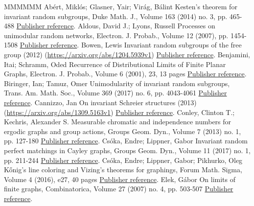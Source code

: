 \begin{thebibliography}{MMMMMM}
 Abért, Miklós; Glasner, Yair; Virág, Bálint Kesten’s theorem for invariant random subgroups, Duke Math. J., Volume 163 (2014) no. 3, pp. 465-488 \href{https://ahl.centre-mersenne.org/item/AHL_2021__4__1705_0/#abert2014kesten}{Publisher reference}.
 Aldous, David J.; Lyons, Russell Processes on unimodular random networks, Electron. J. Probab., Volume 12 (2007), pp. 1454-1508 \href{https://ahl.centre-mersenne.org/item/AHL_2021__4__1705_0/#aldous2007processes}{Publisher reference}.
 Bowen, Lewis Invariant random subgroups of the free group (2012) (\url{https://arxiv.org/abs/1204.5939v1}) \href{https://ahl.centre-mersenne.org/item/AHL_2021__4__1705_0/#bowen2012invariant}{Publisher reference}.
 Benjamini, Itai; Schramm, Oded Recurrence of Distributional Limits of Finite Planar Graphs, Electron. J. Probab., Volume 6 (2001), 23, 13 pages \href{https://ahl.centre-mersenne.org/item/AHL_2021__4__1705_0/#benjamini2001}{Publisher reference}.
 Biringer, Ian; Tamuz, Omer Unimodularity of invariant random subgroups, Trans. Am. Math. Soc., Volume 369 (2017) no. 6, pp. 4043-4061 \href{https://ahl.centre-mersenne.org/item/AHL_2021__4__1705_0/#biringer2017unimodularity}{Publisher reference}.
 Cannizzo, Jan On invariant Schreier structures (2013) (\url{https://arxiv.org/abs/1309.5163v1}) \href{https://ahl.centre-mersenne.org/item/AHL_2021__4__1705_0/#cannizzo2013invariant}{Publisher reference}.
 Conley, Clinton T.; Kechris, Alexander S. Measurable chromatic and independence numbers for ergodic graphs and group actions, Groups Geom. Dyn., Volume 7 (2013) no. 1, pp. 127-180 \href{https://ahl.centre-mersenne.org/item/AHL_2021__4__1705_0/#conley2013measurable}{Publisher reference}.
 Csóka, Endre; Lippner, Gabor Invariant random perfect matchings in Cayley graphs, Groups Geom. Dyn., Volume 11 (2017) no. 1, pp. 211-244 \href{https://ahl.centre-mersenne.org/item/AHL_2021__4__1705_0/#csoka2017invariant}{Publisher reference}.
 Csóka, Endre; Lippner, Gabor; Pikhurko, Oleg Kőnig’s line coloring and Vizing’s theorems for graphings, Forum Math. Sigma, Volume 4 (2016), e27, 40 pages \href{https://ahl.centre-mersenne.org/item/AHL_2021__4__1705_0/#csoka2016kHonig}{Publisher reference}.
 Elek, Gábor On limits of finite graphs, Combinatorica, Volume 27 (2007) no. 4, pp. 503-507 \href{https://ahl.centre-mersenne.org/item/AHL_2021__4__1705_0/#elek2007note}{Publisher reference}.

\end{thebibliography}
